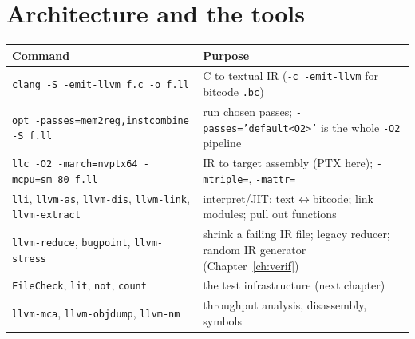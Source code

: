 \documentclass[10pt,a4paper,openany,oneside]{report}
\newcommand{\prio}[1]{\texorpdfstring{\ifcase#1\or{\color{gold}\ding{72}}\or{\color{gold}\ding{72}\ding{72}}\or{\color{gold}\ding{72}\ding{72}\ding{72}}\fi}{}}
\begin{document}
\section{Architecture and the tools \prio{3}}
\begin{center}
\end{center}
\begin{center}\small
\begin{xltabular}{\textwidth}{@{}L{4.4cm}Y@{}}
\toprule
\textbf{Command} & \textbf{Purpose}\\
\midrule\endhead
\texttt{clang -S -emit-llvm f.c -o f.ll} & C to textual IR (\texttt{-c -emit-llvm} for bitcode \texttt{.bc})\\
\texttt{opt -passes=mem2reg,instcombine -S f.ll} & run chosen passes; \texttt{-passes='default<O2>'} is the whole \texttt{-O2} pipeline\\
\texttt{llc -O2 -march=nvptx64 -mcpu=sm\_80 f.ll} & IR to target assembly (PTX here); \texttt{-mtriple=}, \texttt{-mattr=}\\
\texttt{lli}, \texttt{llvm-as}, \texttt{llvm-dis}, \texttt{llvm-link}, \texttt{llvm-extract} & interpret/JIT; text$\leftrightarrow$bitcode; link modules; pull out functions\\
\texttt{llvm-reduce}, \texttt{bugpoint}, \texttt{llvm-stress} & shrink a failing IR file; legacy reducer; random IR generator (Chapter~\ref{ch:verif})\\
\texttt{FileCheck}, \texttt{lit}, \texttt{not}, \texttt{count} & the test infrastructure (next chapter)\\
\texttt{llvm-mca}, \texttt{llvm-objdump}, \texttt{llvm-nm} & throughput analysis, disassembly, symbols\\
\bottomrule
\end{xltabular}
\end{center}
\end{document}
